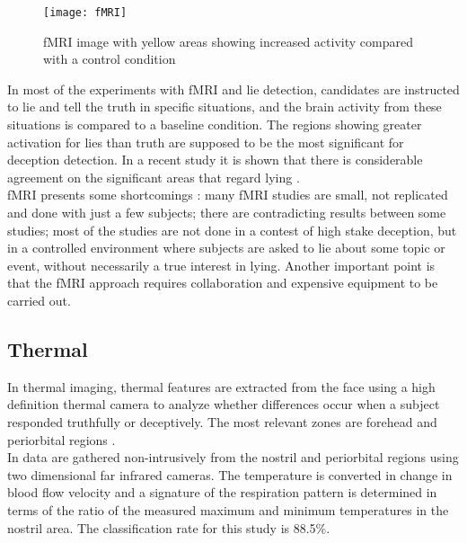 \begin{figure}[!]
	\centering
	\texttt{[image: fMRI]}
	\caption{fMRI image with yellow areas showing increased activity compared with a control condition  \cite{WikifMRI}}
\end{figure}
In most of the experiments with fMRI and lie detection, candidates are instructed to lie and tell the truth in specific situations, and the brain activity from these situations is compared to a baseline condition. The regions showing greater activation for lies than truth are supposed to be the most significant for deception detection. In a recent study it is shown that there is considerable agreement on the significant areas that regard lying \cite{fMRILD}.\\
fMRI presents some shortcomings \cite{fMRIDD}\cite{fMRIDA}: many fMRI studies are small, not replicated and done with just a few subjects; there are contradicting results between some studies; most of the studies are not done in a contest of high stake deception, but in a controlled environment where subjects are asked to lie about some topic or event, without necessarily a true interest in lying. Another important point is that the fMRI approach requires collaboration and expensive equipment to be carried out.

\subsection*{Thermal}
In thermal imaging, thermal features are extracted from the face using a high definition thermal camera to analyze whether differences occur when a subject responded truthfully or deceptively. The most relevant zones are forehead and periorbital regions \cite{Rajoub} \cite{Abouelenien:2015:TAD:2823465.2823470}. \\
In \cite{6967765} data are gathered non-intrusively from the nostril and periorbital regions using two dimensional far infrared cameras. The temperature is converted in change in blood flow velocity and a signature of the respiration pattern is determined in terms of the ratio of the measured maximum and minimum temperatures in the nostril area. The classification rate for this study is 88.5\%.

